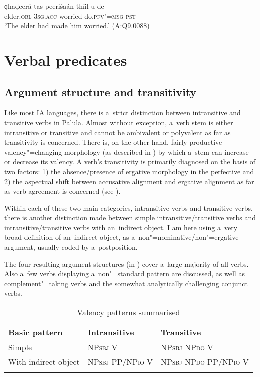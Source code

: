 \begin{exe}
\ex
\label{ex:12-35}
\gll ɡhaḍeerá tas peerišaán thíil-u de \\
elder.\textsc{obl} \textsc{3sg.acc} worried do.\textsc{pfv"=msg} \textsc{pst} \\
\glt `The elder had made him worried.' (A:Q9.0088)
\end{exe}

\section{Verbal predicates}
\label{sec:12-2}

\subsection{Argument structure and transitivity}
\label{subsec:12-2-1}


Like most IA languages, there is a~strict distinction between intransitive and transitive verbs in Palula. Almost without exception, a~verb stem is either intransitive or transitive and cannot be ambivalent or polyvalent as far as transitivity is concerned. There is, on the other hand, fairly productive valency"=changing morphology (as described in ) by which a~stem can increase or decrease its valency. A verb's transitivity is primarily diagnosed on the basis of two factors: 1) the absence/presence of ergative morphology in the perfective and 2) the aspectual shift between accusative alignment and ergative alignment as far as verb agreement is concerned (see ). 


Within each of these two main categories, intransitive verbs and transitive verbs, there is another distinction made between simple intransitive/transitive verbs and intransitive/transitive verbs with an~indirect object. I am here using a~very broad definition of an~indirect object, as a~non"=nominative/non"=ergative argument, usually coded by a~postposition. 


The four resulting argument structures (in ) cover a~large majority of all verbs. Also a~few verbs displaying a~non"=standard pattern are discussed, as well as complement"=taking verbs and the somewhat analytically challenging conjunct verbs.


\begin{table}[ht]
\caption{Valency patterns summarised}

\begin{tabularx}{\textwidth}{ Q Q Q }
\lsptoprule
Basic pattern &
Intransitive &
Transitive\\\hline
Simple &
NP\textsc{sbj} V &
NP\textsc{sbj} NP\textsc{do} V\\
With indirect object &
NP\textsc{sbj} PP/NP\textsc{io} V &
NP\textsc{sbj} NP\textsc{do} PP/NP\textsc{io} V\\\lspbottomrule
\end{tabularx}
\label{tab:12-2}
\end{table}


